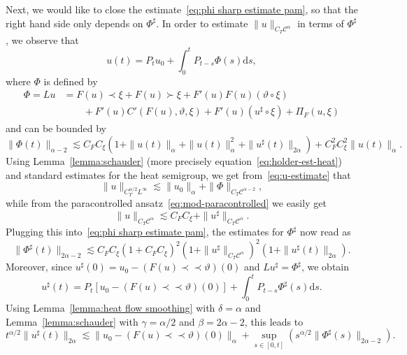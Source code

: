 \documentclass[11pt,a4paper]{article}
\newcommand{\mathd}{\mathrm{d}}
\newcommand{\precprec}{\prec\!\!\!\prec}
\theoremstyle{remark}
\newcommand{\CC}{\ensuremath{\mathscr{C}}}
\begin{document}
Next, we would like to close the estimate~\eqref{eq:phi sharp estimate pam},
so that the right hand side only depends on $\Phi^{\sharp}$. In order to
estimate $\| u \|_{C_{T} \CC^\alpha}$ in terms of $\Phi^{\sharp}$,
we observe that
\begin{equation}\label{eq:u-estimate}
  u ( t ) =P_{t} u_{0} + \int_{0}^{t} P_{t-s} \Phi ( s ) \mathd s,
\end{equation}
where $\Phi$ is defined by
\begin{align*}
   \Phi =L u & =F ( u ) \prec \xi +F ( u ) \succ \xi +F' ( u ) F ( u )  (\vartheta \circ \xi ) \\
   &\qquad +F' ( u ) C' ( F ( u ) , \vartheta , \xi ) +F' ( u )  ( u^{\sharp} \circ \xi ) + \Pi_{F} ( u, \xi )
\end{align*}
and can be bounded by
\[
   \| \Phi ( t ) \|_{\alpha -2} \lesssim C_{F} C_{\xi} ( 1+ \| u ( t ) \|_{\alpha} + \| u ( t ) \|_{\alpha}^{2} + \| u^{\sharp} ( t ) \|_{2 \alpha} ) +C_{F}^{2} C_{\xi}^{2} \| u ( t ) \|_{\alpha}.
\]
Using Lemma~\ref{lemma:schauder} (more precisely equation~{\eqref{eq:holder-est-heat}}) and standard estimates for the heat
semigroup, we get from~{\eqref{eq:u-estimate}} that
\[
   \| u \|_{C_{T}^{\alpha /2} L^{\infty}} \lesssim \| u_{0} \|_{\alpha} + \| \Phi \|_{C_{T} \CC^{\alpha -2}},
\]
while from the paracontrolled ansatz~{\eqref{eq:mod-paracontrolled}} we easily get
\begin{equation}\label{eq:pam u bounded by phi sharp}
   \| u \|_{C_{T} \CC^\alpha}
  \lesssim C_{F} C_{\xi} + \| u^{\sharp} \|_{C_{T} \CC^\alpha}.
\end{equation}
Plugging this into~{\eqref{eq:phi sharp estimate pam}}, the estimates for
$\Phi^{\sharp}$ now read as
\[
   \| \Phi^{\sharp} ( t ) \|_{2 \alpha -2} \lesssim C_{F} C_{\xi} ( 1+C_{F} C_{\xi} )^{2} ( 1+ \| u^{\sharp} \|_{C_{T} \CC^\alpha} )^{2} ( 1+ \| u^{\sharp} ( t ) \|_{2 \alpha} ).
\]
Moreover, since $u^{\sharp} ( 0 ) =u_{0} - ( F ( u ) \precprec \vartheta ) ( 0)$ and $L u^{\sharp} = \Phi^{\sharp}$, we obtain
\begin{equation}\label{eq:u sharp differential equation}
   u^{\sharp} ( t ) =P_{t} [ u_{0} - (F ( u ) \precprec \vartheta ) ( 0 ) ] + \int_{0}^{t} P_{t-s} \Phi^{\sharp} (s ) \mathd s.
\end{equation}
Using Lemma~\ref{lemma:heat flow smoothing} with $\delta = \alpha$ and
Lemma~\ref{lemma:schauder} with $\gamma = \alpha /2$ and $\beta = 2\alpha-2$, this leads to
\[
   t^{\alpha /2} \| u^{\sharp} ( t ) \|_{2 \alpha} \lesssim \| u_{0} - ( F ( u) \precprec \vartheta ) ( 0 ) \|_{\alpha} + \sup_{s \in [ 0,t ]} (s^{\alpha /2} \| \Phi^{\sharp} ( s ) \|_{2 \alpha -2} ).
\]
\end{document}
